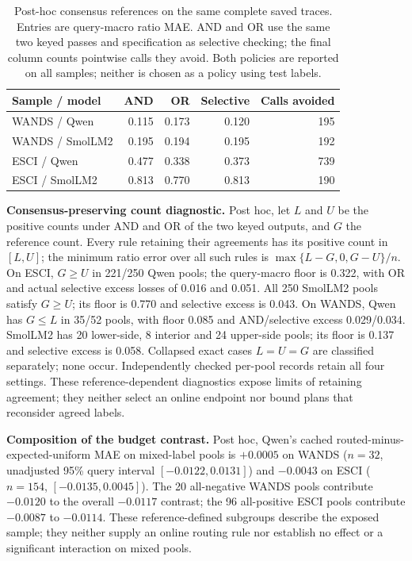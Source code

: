 \documentclass[conference]{IEEEtran}
\begin{document}
\begin{table}[t]
\caption{Post-hoc consensus references on the same complete saved traces.
Entries are query-macro ratio MAE. AND and OR use the same two keyed passes
and specification as selective checking; the final column counts pointwise
calls they avoid. Both policies are reported on all samples; neither is chosen as a policy using test labels.}
\label{tab:consensus}
\centering\footnotesize
\begin{tabular}{lrrrr}
\toprule
Sample / model & AND & OR & Selective & Calls avoided \\
\midrule
WANDS / Qwen & 0.115 & 0.173 & 0.120 & 195 \\
WANDS / SmolLM2 & 0.195 & 0.194 & 0.195 & 192 \\
ESCI / Qwen & 0.477 & 0.338 & 0.373 & 739 \\
ESCI / SmolLM2 & 0.813 & 0.770 & 0.813 & 190 \\
\bottomrule
\end{tabular}
\end{table}

\textbf{Consensus-preserving count diagnostic.}
Post hoc, let $L$ and $U$ be the positive counts under AND and OR of the two keyed
outputs, and $G$ the reference count. Every rule retaining their agreements has
its positive count in $[L,U]$; the minimum ratio error over all such rules is
$\max\{L-G,0,G-U\}/n$. On ESCI, $G\geq U$ in 221/250 Qwen pools;
the query-macro floor is 0.322, with OR and actual selective excess losses
of 0.016 and 0.051. All 250 SmolLM2 pools satisfy $G\geq U$; its floor is
0.770 and selective excess is 0.043. On WANDS, Qwen has $G\leq L$ in 35/52
pools, with floor 0.085 and AND/selective excess 0.029/0.034. SmolLM2 has
20 lower-side, 8 interior and 24 upper-side pools; its floor is 0.137 and
selective excess is 0.058. Collapsed exact cases $L=U=G$ are classified separately;
none occur. Independently checked per-pool records retain all four settings.
These reference-dependent diagnostics expose limits of retaining agreement;
they neither select an online endpoint nor bound plans that reconsider agreed labels.

\textbf{Composition of the budget contrast.}
Post hoc, Qwen's cached routed-minus-expected-uniform MAE on mixed-label pools
is $+0.0005$ on WANDS ($n=32$, unadjusted 95\% query interval
$[-0.0122,0.0131]$) and $-0.0043$ on ESCI ($n=154$,
$[-0.0135,0.0045]$). The 20 all-negative WANDS pools contribute $-0.0120$
to the overall $-0.0117$ contrast; the 96 all-positive ESCI pools contribute
$-0.0087$ to $-0.0114$. These reference-defined subgroups describe the exposed
sample; they neither supply an online routing rule nor establish no effect
or a significant interaction on mixed pools.
\end{document}
